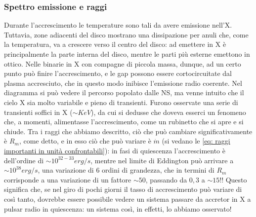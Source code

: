 \subsubsection{Spettro emissione e raggi}
Durante l'accrescimento le temperature sono tali da avere emissione nell'X. Tuttavia, zone adiacenti del disco mostrano una dissipazione per anuli che, come la temperatura, va a crescere verso il centro del disco:
ad emettere in X è principalmente la parte interna del disco, mentre le parti più esterne emettono in ottico.
Nelle binarie in X con compagne di piccola massa, dunque, ad un certo punto può finire l'accrescimento, e le gap possono essere cortocircuitate dal plasma accresciuto, che in questo modo inibisce l'emissione radio coerente.
Nel diagramma si può vedere il percorso popolato dalle NS, ma venne intuito che il cielo X sia molto variabile e pieno di transienti.
Furono osservate una serie di transienti soffici in X ($\sim KeV$), da cui si dedusse che doveva esserci un fenomeno che, a momenti, alimentasse l'accrescimento, come un rubinetto che si apre e si chiude.
Tra i raggi che abbiamo descritto, ciò che può cambiare significativamente è $R_m$, come detto, e in esso ciò che può variare è $\dot{m}$ (si vedano le \eqref{eq: raggi importanti in unità confrontabili}):
in fasi di quiescenza l'accrescimento è dell'ordine di $\sim10^{32-33}erg/s $, mentre nel limite di Eddington può arrivare a $\sim10^{38}erg/s $, una variazione di $6$ ordini di grandezza, che in termini di $R_m$ corrisponde a una variazione di un fattore $\sim50$, passando da $0,3$ a $\sim 15$!!
Questo significa che, se nel giro di pochi giorni il tasso di accrescimento può variare di così tanto, dovrebbe essere possibile vedere un sistema passare da accretor in X a pulsar radio in quiescenza: un sistema così, in effetti, lo abbiamo osservato!

